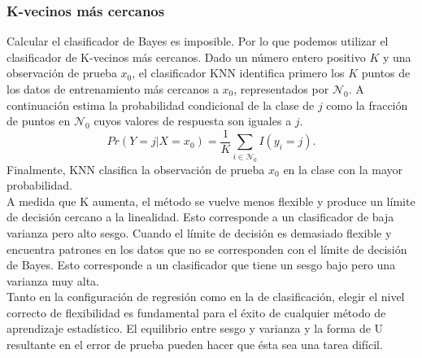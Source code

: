  \subsubsection{K-vecinos más cercanos}
 Calcular el clasificador de Bayes es imposible. Por lo que podemos utilizar el clasificador de K-vecinos más cercanos. Dado un número entero positivo $K$ y una observación de prueba $x_0$, el clasificador KNN identifica primero los $K$ puntos de los datos de entrenamiento más cercanos a $x_0$, representados por $\mathcal{N}_0$. A continuación estima la probabilidad condicional de la clase de $j$ como la fracción de puntos en $\mathcal{N}_0$ cuyos valores de respuesta son iguales a $j$.
 $$Pr(Y=j|X=x_0)=\dfrac{1}{K}\sum_{i\in \mathcal{N}_0}I\left(y_i=j\right).$$
 Finalmente, KNN clasifica la observación de prueba $x_0$ en la clase con la mayor probabilidad.\\

  A medida que K aumenta, el método se vuelve menos flexible y produce un límite de decisión cercano a la linealidad. Esto corresponde a un clasificador de baja varianza pero alto sesgo. Cuando el límite de decisión es demasiado flexible y encuentra patrones en los datos que no se corresponden con el límite de decisión de Bayes. Esto corresponde a un clasificador que tiene un sesgo bajo pero una varianza muy alta.\\

  Tanto en la configuración de regresión como en la de clasificación, elegir el nivel correcto de flexibilidad es fundamental para el éxito de cualquier método de aprendizaje estadístico. El equilibrio entre sesgo y varianza y la forma de U resultante en el error de prueba pueden hacer que ésta sea una tarea difícil.
